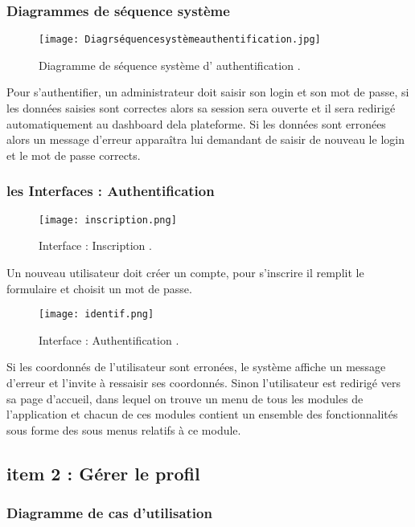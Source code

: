 \subsubsection{Diagrammes de séquence système }

\begin{figure}[ht]
	\centering
	\texttt{[image: Diagrséquencesystèmeauthentification.jpg]}
	\caption{Diagramme de séquence système d' authentification .}
	\label{fig:Diagramme de séquence système d' authentification }
\end{figure}
\FloatBarrier
Pour s’authentifier, un administrateur doit saisir son login et son mot de passe, si les
données saisies sont correctes alors sa session sera ouverte et il sera redirigé automatiquement au dashboard dela plateforme. Si les données sont erronées alors un message d’erreur
apparaîtra lui demandant de saisir de nouveau le login et le mot de passe corrects.
\clearpage
\subsubsection{les Interfaces : Authentification  }


\begin{figure}[ht]
	\centering
	\texttt{[image: inscription.png]}
	\caption{Interface : Inscription .}
	\label{fig:Interface : inscription }
\end{figure}
\FloatBarrier
Un nouveau utilisateur doit créer un compte, pour s’inscrire il remplit le formulaire et
choisit un mot de passe. 


\begin{figure}[ht]
	\centering
	\texttt{[image: identif.png]}
	\caption{Interface : Authentification .}
	\label{fig:Interface : Authentification }
\end{figure}
\FloatBarrier
Si les coordonnés de l’utilisateur sont erronées, le système affiche un message d’erreur et
l’invite à ressaisir ses coordonnés.
Sinon l’utilisateur est redirigé vers sa page d’accueil, dans lequel on trouve un menu de tous les
modules de l’application et chacun de ces modules contient un ensemble des fonctionnalités
sous forme des sous menus relatifs à ce module.
\clearpage
\subsection{item 2 : Gérer le profil}
\subsubsection{Diagramme de cas d’utilisation }


